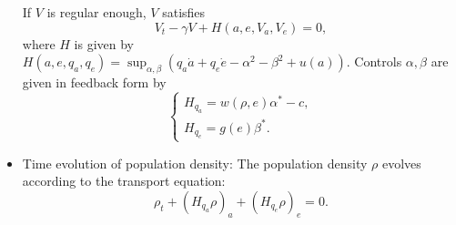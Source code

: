 \documentclass{article}
\begin{document}
\begin{itemize}
    If $V$ is regular enough, $V$ satisfies 
    \[
        V_t - \gamma V + H(a,e,V_a, V_e) = 0,
    \]
    where $H$ is given by
    $H(a,e,q_a, q_e) = \sup_{\alpha, \beta} \left( q_a {\dot a} + q_e {\dot e}  - \alpha^2 - \beta^2 + u(a) \right)$.
    Controls $\alpha, \beta$ are given in feedback form by 
    \begin{equation}
        \begin{cases}
            H_{q_a} = w(\rho, e) \alpha^* - c,\\
            H_{q_e} = g(e) \beta^*.
        \end{cases}
    \end{equation}
    \item Time evolution of population density: The population density $\rho$ evolves according to the transport equation:
    \begin{equation}
        \rho_t + ( H_{q_a} \rho )_a + (H_{q_e} \rho)_e = 0.
    \end{equation}   
\end{itemize}
\end{document}
